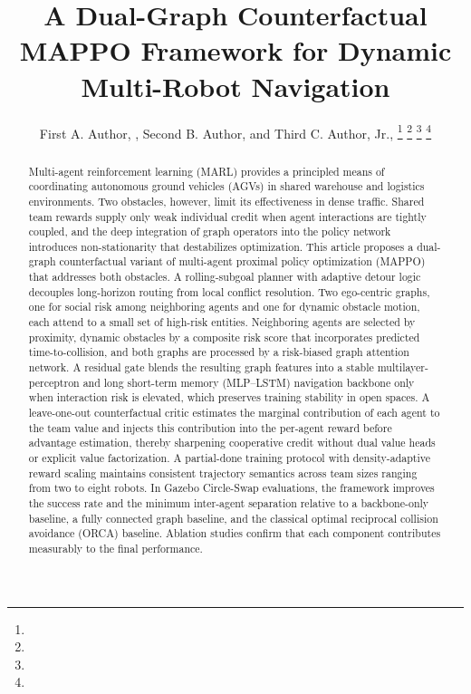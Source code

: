 \documentclass[journal,twoside,web]{ieeecolor}
\begin{document}
\title{A Dual-Graph Counterfactual MAPPO Framework for Dynamic Multi-Robot Navigation}
\author{First A. Author, , Second B. Author, and Third C. Author, Jr., 
\thanks{}
\thanks{}
\thanks{}
\thanks{}}

\maketitle

\begin{abstract}
Multi-agent reinforcement learning (MARL) provides a principled means of coordinating autonomous ground vehicles (AGVs) in shared warehouse and logistics environments. Two obstacles, however, limit its effectiveness in dense traffic. Shared team rewards supply only weak individual credit when agent interactions are tightly coupled, and the deep integration of graph operators into the policy network introduces non-stationarity that destabilizes optimization. This article proposes a dual-graph counterfactual variant of multi-agent proximal policy optimization (MAPPO) that addresses both obstacles. A rolling-subgoal planner with adaptive detour logic decouples long-horizon routing from local conflict resolution. Two ego-centric graphs, one for social risk among neighboring agents and one for dynamic obstacle motion, each attend to a small set of high-risk entities. Neighboring agents are selected by proximity, dynamic obstacles by a composite risk score that incorporates predicted time-to-collision, and both graphs are processed by a risk-biased graph attention network. A residual gate blends the resulting graph features into a stable multilayer-perceptron and long short-term memory (MLP--LSTM) navigation backbone only when interaction risk is elevated, which preserves training stability in open spaces. A leave-one-out counterfactual critic estimates the marginal contribution of each agent to the team value and injects this contribution into the per-agent reward before advantage estimation, thereby sharpening cooperative credit without dual value heads or explicit value factorization. A partial-done training protocol with density-adaptive reward scaling maintains consistent trajectory semantics across team sizes ranging from two to eight robots. In Gazebo Circle-Swap evaluations, the framework improves the success rate and the minimum inter-agent separation relative to a backbone-only baseline, a fully connected graph baseline, and the classical optimal reciprocal collision avoidance (ORCA) baseline. Ablation studies confirm that each component contributes measurably to the final performance.
\end{abstract}
\end{document}
